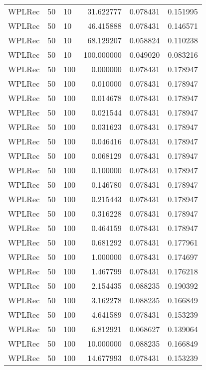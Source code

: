 \begin{tabular}{lllrrr}
 WPLRec &   50 &     10 &   31.622777 &     0.078431 &  0.151995 \\
 WPLRec &   50 &     10 &   46.415888 &     0.078431 &  0.146571 \\
 WPLRec &   50 &     10 &   68.129207 &     0.058824 &  0.110238 \\
 WPLRec &   50 &     10 &  100.000000 &     0.049020 &  0.083216 \\
 WPLRec &   50 &    100 &    0.000000 &     0.078431 &  0.178947 \\
 WPLRec &   50 &    100 &    0.010000 &     0.078431 &  0.178947 \\
 WPLRec &   50 &    100 &    0.014678 &     0.078431 &  0.178947 \\
 WPLRec &   50 &    100 &    0.021544 &     0.078431 &  0.178947 \\
 WPLRec &   50 &    100 &    0.031623 &     0.078431 &  0.178947 \\
 WPLRec &   50 &    100 &    0.046416 &     0.078431 &  0.178947 \\
 WPLRec &   50 &    100 &    0.068129 &     0.078431 &  0.178947 \\
 WPLRec &   50 &    100 &    0.100000 &     0.078431 &  0.178947 \\
 WPLRec &   50 &    100 &    0.146780 &     0.078431 &  0.178947 \\
 WPLRec &   50 &    100 &    0.215443 &     0.078431 &  0.178947 \\
 WPLRec &   50 &    100 &    0.316228 &     0.078431 &  0.178947 \\
 WPLRec &   50 &    100 &    0.464159 &     0.078431 &  0.178947 \\
 WPLRec &   50 &    100 &    0.681292 &     0.078431 &  0.177961 \\
 WPLRec &   50 &    100 &    1.000000 &     0.078431 &  0.174697 \\
 WPLRec &   50 &    100 &    1.467799 &     0.078431 &  0.176218 \\
 WPLRec &   50 &    100 &    2.154435 &     0.088235 &  0.190392 \\
 WPLRec &   50 &    100 &    3.162278 &     0.088235 &  0.166849 \\
 WPLRec &   50 &    100 &    4.641589 &     0.078431 &  0.153239 \\
 WPLRec &   50 &    100 &    6.812921 &     0.068627 &  0.139064 \\
 WPLRec &   50 &    100 &   10.000000 &     0.088235 &  0.166849 \\
 WPLRec &   50 &    100 &   14.677993 &     0.078431 &  0.153239 \\

\end{tabular}
